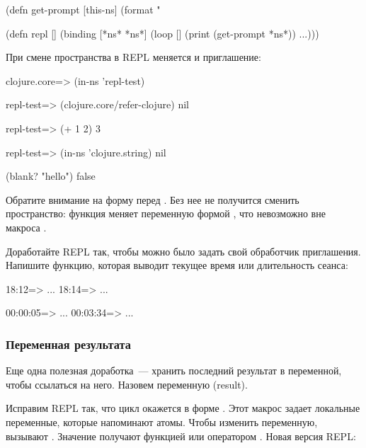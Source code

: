 \begin{english}
  \begin{clojure/lines}
(defn get-prompt
  [this-ns]
  (format "%

(defn repl
  []
  (binding [*ns* *ns*]
    (loop []
      (print (get-prompt *ns*))
      ...)))
  \end{clojure/lines}
\end{english}

\pagebreaklarge

При смене пространства в REPL меняется и приглашение:

\begin{english}
  \begin{clojure}
clojure.core=> (in-ns 'repl-test)

repl-test=> (clojure.core/refer-clojure)
nil

repl-test=> (+ 1 2)
3

repl-test=> (in-ns 'clojure.string)
nil

(blank? "hello")
false
  \end{clojure}
\end{english}

Обратите внимание на форму  перед  . Без нее не получится сменить пространство: функция  меняет переменную  формой , что невозможно вне макроса .

Доработайте REPL так, чтобы можно было задать свой обработчик приглашения. Напишите функцию, которая выводит текущее время или длительность сеанса:

\begin{english}
  \begin{clojure}
18:12=> ...
18:14=> ...

00:00:05=> ...
00:03:34=> ...
  \end{clojure}
\end{english}

\subsubsection{Переменная результата}

Еще одна полезная доработка~--- хранить последний результат в переменной, чтобы ссылаться на него. Назовем переменную  (result).

Исправим REPL так, что цикл окажется в форме . Этот макрос задает локальные переменные, которые напоминают атомы. Чтобы изменить переменную, вызывают . Значение получают функцией  или оператором  . Новая версия REPL:

